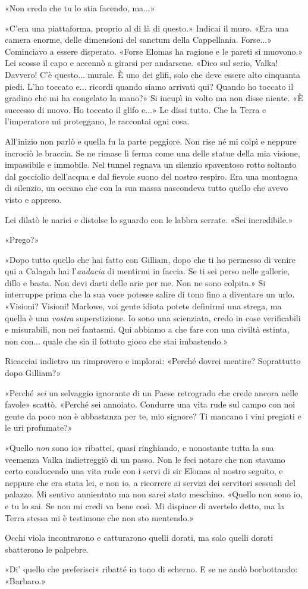 «Non credo che tu lo stia facendo, ma...»

«C'era una piattaforma, proprio al di là di questo.» Indicai il muro.
«Era una camera enorme, delle dimensioni del sanctum della Cappellania.
Forse...» Cominciavo a essere disperato. «Forse Elomas ha ragione e le
pareti si muovono.» Lei scosse il capo e accennò a girarsi per
andarsene. «Dico sul serio, Valka! Davvero! C'è questo... murale. È uno
dei glifi, solo che deve essere alto cinquanta piedi. L'ho toccato e...
ricordi quando siamo arrivati qui? Quando ho toccato il gradino che mi
ha congelato la mano?» Si incupì in volto ma non disse niente. «È
successo di nuovo. Ho toccato il glifo e...» Le dissi tutto. Che la
Terra e l'imperatore mi proteggano, le raccontai ogni cosa.

All'inizio non parlò e quella fu la parte peggiore. Non rise né mi colpì
e neppure incrociò le braccia. Se ne rimase lì ferma come una delle
statue della mia visione, impassibile e immobile. Nel tunnel regnava un
silenzio spaventoso rotto soltanto dal gocciolio dell'acqua e dal
fievole suono del nostro respiro. Era una montagna di silenzio, un
oceano che con la sua massa nascondeva tutto quello che avevo visto e
appreso.

Lei dilatò le narici e distolse lo sguardo con le labbra serrate. «Sei
incredibile.»

«Prego?»

«Dopo tutto quello che hai fatto con Gilliam, dopo che ti ho {permesso}
di venire qui a Calagah hai l'\emph{audacia} di mentirmi in faccia. Se
ti sei perso nelle gallerie, dillo e basta. Non devi darti delle arie
per me. Non ne sono colpita.» Si interruppe prima che la sua voce
potesse salire di tono fino a diventare un urlo. «Visioni? Visioni!
Marlowe, voi gente idiota potete definirmi una strega, ma quella è una
\emph{vostra} superstizione. Io sono una scienziata, credo in cose
verificabili e misurabili, non nei fantasmi. Qui abbiamo a che fare con
una civiltà estinta, non con... quale che sia il fottuto gioco che stai
imbastendo.»

Ricacciai indietro un rimprovero e implorai: «Perché dovrei mentire?
Soprattutto dopo Gilliam?»

«Perché \emph{sei} un selvaggio ignorante di un Paese retrogrado che
crede ancora nelle favole» scattò. «Perché sei annoiato. Condurre una
vita rude sul campo con noi gente da poco non è abbastanza per te, mio
signore? Ti mancano i vini pregiati e le uri profumate?»

«Quello \emph{non} sono io» ribattei, quasi ringhiando, e nonostante
tutta la sua veemenza Valka indietreggiò di un passo. Non le feci notare
che non stavamo certo conducendo una vita rude con i servi di sir Elomas
al nostro seguito, e neppure che era stata lei, e non io, a ricorrere ai
servizi dei servitori sessuali del palazzo. Mi sentivo annientato ma non
sarei stato meschino. «Quello non sono io, e tu lo sai. Se non mi credi
va bene così. Mi dispiace di avertelo detto, ma la Terra stessa mi è
testimone che non sto mentendo.»

Occhi viola incontrarono e catturarono quelli dorati, ma solo quelli
dorati sbatterono le palpebre.

«Di' quello che preferisci» ribatté in tono di scherno. E se ne andò
borbottando: «Barbaro.»

